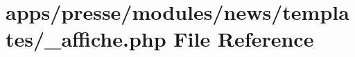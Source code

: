 \hypertarget{presse_2modules_2news_2templates_2__affiche_8php}{\section{apps/presse/modules/news/templates/\-\_\-affiche.php File Reference}
\label{presse_2modules_2news_2templates_2__affiche_8php}
}
